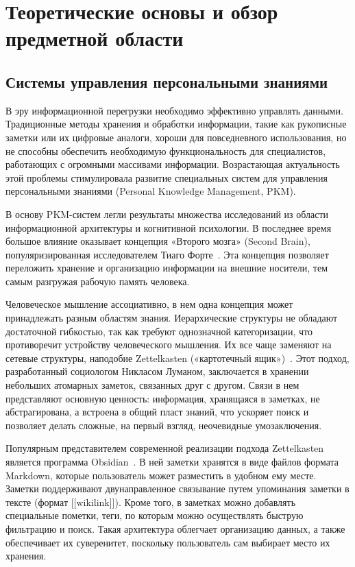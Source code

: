\clearpage
\section{Теоретические основы и обзор предметной области}
\subsection{Системы управления персональными знаниями}

В эру информационной перегрузки
необходимо эффективно управлять данными.
Традиционные методы хранения и обработки информации,
такие как рукописные заметки или их цифровые аналоги,
хороши для повседневного использования, но
не способны обеспечить необходимую функциональность
для специалистов, работающих с огромными массивами информации.
Возрастающая актуальность этой проблемы
стимулировала развитие специальных систем для управления персональными знаниями
(Personal Knowledge Management, PKM).


В основу PKM-систем легли результаты множества исследований
из области информационной архитектуры и когнитивной психологии.
В последнее время большое влияние оказывает
концепция «Второго мозга» (Second Brain),
популяризированная исследователем Тиаго Форте~\cite{Forte_2022}.
Эта концепция позволяет переложить хранение и организацию информации на внешние носители,
тем самым разгружая рабочую память человека.

Человеческое мышление ассоциативно,
в нем одна концепция может принадлежать разным областям знания.
Иерархические структуры не обладают достаточной гибкостью,
так как требуют однозначной категоризации,
что противоречит устройству человеческого мышления.
Их все чаще заменяют на
сетевые структуры, наподобие
Zettelkasten («картотечный ящик»)~\cite{Ahrens_2017}.
Этот подход, разработанный социологом Никласом Луманом,
заключается в хранении небольших атомарных заметок,
связанных друг с другом.
Связи в нем представляют основную ценность:
информация, хранящаяся в заметках, не абстрагирована,
а встроена в общий пласт знаний,
что ускоряет поиск и позволяет делать сложные,
на первый взгляд, неочевидные умозаключения.

Популярным представителем современной реализации подхода Zettelkasten
является программа Obsidian~\cite{Obsidian}.
В ней заметки хранятся в виде файлов формата Markdown,
которые пользователь может разместить в удобном ему месте.
Заметки поддерживают двунаправленное связывание путем
упоминания заметки в тексте (формат [[wikilink]]).
Кроме того, в заметках можно добавлять специальные пометки, теги,
по которым можно осуществлять быструю фильтрацию и поиск.
Такая архитектура облегчает организацию данных,
а также обеспечивает их суверенитет, поскольку
пользователь сам выбирает место их хранения.

